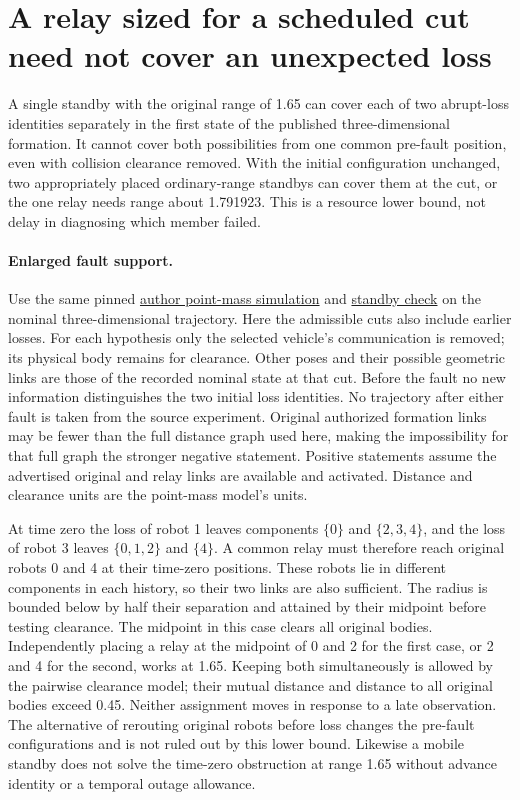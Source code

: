 \documentclass{article}
\begin{document}
\section*{A relay sized for a scheduled cut need not cover an unexpected loss}
A single standby with the original range of 1.65 can cover each of two abrupt-loss identities separately in the first state of the published three-dimensional formation. It cannot cover both possibilities from one common pre-fault position, even with collision clearance removed. With the initial configuration unchanged, two appropriately placed ordinary-range standbys can cover them at the cut, or the one relay needs range about 1.791923. This is a resource lower bound, not delay in diagnosing which member failed.

\paragraph{Enlarged fault support.}
Use the same pinned \href{https://github.com/KTH-DHSG/constrained_omrs/tree/cb87f91aaaa4e652de043704ce4dfb989e10bcde}{author point-mass simulation} and \href{https://github.com/eternal-november/eos-research-programmes/pull/471}{standby check} on the nominal three-dimensional trajectory. Here the admissible cuts also include earlier losses. For each hypothesis only the selected vehicle's communication is removed; its physical body remains for clearance. Other poses and their possible geometric links are those of the recorded nominal state at that cut. Before the fault no new information distinguishes the two initial loss identities. No trajectory after either fault is taken from the source experiment. Original authorized formation links may be fewer than the full distance graph used here, making the impossibility for that full graph the stronger negative statement. Positive statements assume the advertised original and relay links are available and activated. Distance and clearance units are the point-mass model's units.

At time zero the loss of robot 1 leaves components $\{0\}$ and $\{2,3,4\}$, and the loss of robot 3 leaves $\{0,1,2\}$ and $\{4\}$. A common relay must therefore reach original robots 0 and 4 at their time-zero positions. These robots lie in different components in each history, so their two links are also sufficient. The radius is bounded below by half their separation and attained by their midpoint before testing clearance. The midpoint in this case clears all original bodies. Independently placing a relay at the midpoint of 0 and 2 for the first case, or 2 and 4 for the second, works at 1.65. Keeping both simultaneously is allowed by the pairwise clearance model; their mutual distance and distance to all original bodies exceed 0.45. Neither assignment moves in response to a late observation. The alternative of rerouting original robots before loss changes the pre-fault configurations and is not ruled out by this lower bound. Likewise a mobile standby does not solve the time-zero obstruction at range 1.65 without advance identity or a temporal outage allowance.
\end{document}
